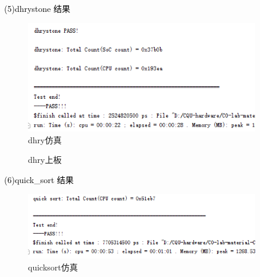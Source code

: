 \newpage
\textcolor{black}{(5)dhrystone 结果}\\
\begin{figure}[htbp]
    \centering
    \includegraphics[width=0.9\textwidth]{image/dhtyS.png}
    \caption{dhry仿真}
\end{figure}

\begin{figure}[htbp]
    \centering
    \caption{dhry上板}
\end{figure}

\newpage
\textcolor{black}{(6)quick\_sort 结果}\\
\begin{figure}[htbp]
    \centering
    \includegraphics[width=0.9\textwidth]{image/quicksortS.png}
    \caption{quicksort仿真}
\end{figure}

